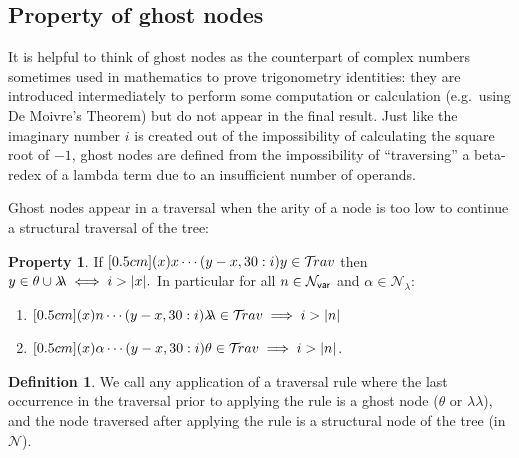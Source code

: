 \documentclass{article}
\theoremstyle{plain}
\theoremstyle{definition}
\newtheorem{definition}{Definition}[section]
\newtheorem{property}{Property}[section]
\theoremstyle{remark}
\newcommand\Nodes{\mathcal{N}}%
\newcommand\NodesVar{\Nodes_{\sf var}}%
\newcommand\NodesLmd{\Nodes_\lambda}%
\newcommand{\ghostlmd}{{\lambda\!\!\lambda}}
\newcommand{\ghostvar}{\theta}
\newcommand{\travulc}{\travset}
\begin{document}
\subsection{Property of ghost nodes}

It is helpful to think of ghost nodes as the counterpart of complex numbers sometimes used in mathematics
to prove trigonometry identities: they are introduced intermediately to perform some computation or calculation (e.g.\ using De Moivre's Theorem) but do not appear in the final result. Just like the imaginary number $i$ is created out of the impossibility of calculating the square root of $-1$, ghost nodes are defined from the impossibility of ``traversing'' a beta-redex of a lambda term due to an insufficient number of operands.


Ghost nodes appear in a traversal when the arity of a node is too low to continue a
structural traversal of the tree:
\begin{property}
\label{prop:ghost_justifier_arity}
If $\Pstr[0.5cm]{(x){x} \cdots (y-x,30:i){y}} \in \travulc$ then
$ y \in \ghostvar \union \ghostlmd \iff i > |x|.$
In particular for all $n\in\NodesVar$ and $\alpha\in\NodesLmd$:
\begin{enumerate}
\item $\Pstr[0.5cm]{(x){n} \cdots (y-x,30:i){\ghostlmd}} \in \travulc \implies i > |n|$
\item $\Pstr[0.5cm]{(x){\alpha} \cdots (y-x,30:i){\ghostvar}} \in \travulc \implies i > |n|$.
\end{enumerate}
\end{property}

\begin{definition}
We call  any application of a traversal rule where the last occurrence in the traversal prior to applying the rule is a ghost node ($\ghostvar$ or $\ghostlmd$), and the node traversed after applying the rule is a structural node of the tree (in $\Nodes$).
\end{definition}
\end{document}
